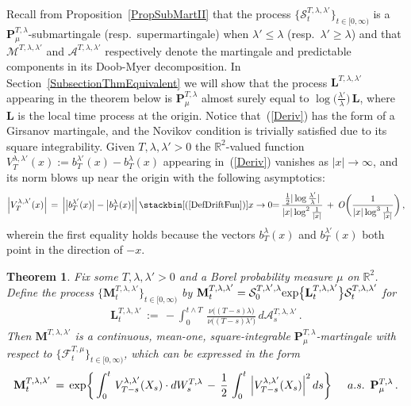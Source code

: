 \documentclass[10pt]{article}
\numberwithin{equation}{section}
\newtheorem{theorem}{Theorem}[section]
\theoremstyle{definition}
\newcommand{\R}{{\mathbb R}}
\begin{document}
 Recall from Proposition~\ref{PropSubMartII} that the process $\{\mathcal{S}_{t}^{T,\lambda,\lambda'}\}_{t\in [0,\infty)}$ is a $\mathbf{P}_{\mu}^{T,\lambda}$-submartingale (resp.\ supermartingale) when $\lambda'\leq \lambda$ (resp.\ $\lambda'\geq \lambda$) and that  $\mathcal{M}^{T,\lambda,\lambda'} $ and $\mathcal{A}^{T,\lambda,\lambda'} $ respectively denote the martingale and predictable components in its Doob-Myer decomposition. In Section~\ref{SubsectionThmEquivalent} we will show that the process $\mathbf{L}^{T,\lambda,\lambda'}$ appearing in the theorem below is $\mathbf{P}_{\mu}^{T,\lambda} $ almost surely equal to $\log\big(\frac{\lambda'}{\lambda}\big) \,\mathbf{L} $, where $\mathbf{L}$ is the local time process at the origin. Notice that~(\ref{Deriv}) has the form of a Girsanov martingale, and the Novikov condition is trivially satisfied due to its square integrability. Given $T,\lambda,\lambda'>0$ the $\R^2$-valued function  
$ V^{\lambda, \lambda'}_{T }(x):=  b_T^{\lambda'}(x) -  b_T^{\lambda}(x) $ appearing in~(\ref{Deriv}) vanishes as $|x|\rightarrow \infty$, and its norm blows up near the origin with the following asymptotics:
\begin{align}\label{VLL}
 \Big|V^{\lambda, \lambda'}_{T }(x)\Big|\,=\, \Big| \big|b_T^{\lambda'}(x)\big| -  \big|b_T^{\lambda}(x)\big| \Big|\,\stackbin[ (\ref{DefDriftFun}) ]{x\rightarrow 0}{=}\,\frac{\frac{1}{2} |\log \frac{\lambda'}{\lambda}| }{|x|\log^2 \frac{1}{|x|} }  \,+ \,\mathit{O}\bigg(\frac{ 1 }{ |x|\log^3 \frac{1}{|x|} }\bigg)\,,
\end{align}
wherein the first equality holds because the vectors $b_T^{\lambda}(x)$ and   $b_T^{\lambda'}(x)$ both point in the direction of $-x$.
\begin{theorem}\label{ThmPreGirsanov} Fix some $T,\lambda,\lambda' >0$ and  a Borel probability measure $\mu$ on $\R^2$.  Define the  process $\{\mathbf{M}^{T,\lambda,\lambda'}_{t}\}_{t\in [0,\infty)}$  by $  \mathbf{M}^{T,\lambda,\lambda'}_{t}=\mathcal{S}_{0}^{T,\lambda',\lambda} \textup{exp}\big\{\mathbf{L}_{t}^{T,\lambda ,\lambda'}  \big\}\mathcal{S}_{t}^{T,\lambda,\lambda'} $ for
\begin{align*}
\mathbf{L}_{t }^{T,\lambda,\lambda'}\,:=\,-\int_0^{t\wedge T}\, \frac{\nu\big( (T-s) \lambda\big)  }{\nu\big((T-s)\lambda' \big)  }\,d\mathcal{A}_{s}^{T,\lambda,\lambda'} \,. 
\end{align*}
 Then $\mathbf{M}^{T,\lambda,\lambda'}$ is a continuous, mean-one, square-integrable  $\mathbf{P}^{T,\lambda}_{\mu}$-martingale with respect to $\{\mathscr{F}_t^{T,\mu }\}_{t\in [0,\infty)}$, which can be expressed  in the  form \begin{align}\label{Deriv} \mathbf{M}_{t}^{T,\lambda,\lambda'} \,=\, \textup{exp}\bigg\{ \int_0^t \,V_{T-s}^{\lambda,\lambda'}(X_s) \cdot   dW_{s}^{T,\lambda}  \,-\,\frac{1}{2}\,\int_0^t  \, \Big|V^{\lambda,\lambda'}_{T-s}(X_s)\Big|^2 \,ds \bigg\}\hspace{.5cm} a.s.\  \,  \mathbf{P}^{T,\lambda}_{\mu} \,.
 \end{align}
\end{theorem}
\end{document}
